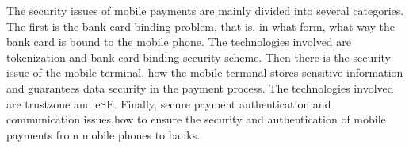 \documentclass[journal]{IEEEtran}
\begin{document}
The security issues of mobile payments are mainly divided into several categories. The first is the bank card binding problem, that is, in what form, what way the bank card is bound to the mobile phone. The technologies involved are tokenization and bank card binding security scheme. Then there is the security issue of the mobile terminal, how the mobile terminal stores sensitive information and guarantees data security in the payment process. The technologies involved are trustzone and eSE. Finally, secure payment authentication and communication issues,how to ensure the security and authentication of mobile payments from mobile phones to banks.

\end{document}

